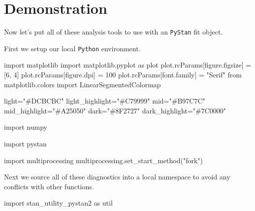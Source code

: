 \documentclass[
  letterpaper,
  DIV=11,
  numbers=noendperiod]{scrartcl}
\newenvironment{Shaded}{\begin{snugshade}}{\end{snugshade}}
\newcommand{\DecValTok}[1]{\textcolor[rgb]{0.68,0.00,0.00}{#1}}
\newcommand{\ImportTok}[1]{\textcolor[rgb]{0.00,0.46,0.62}{#1}}
\newcommand{\NormalTok}[1]{\textcolor[rgb]{0.00,0.23,0.31}{#1}}
\newcommand{\OperatorTok}[1]{\textcolor[rgb]{0.37,0.37,0.37}{#1}}
\newcommand{\StringTok}[1]{\textcolor[rgb]{0.13,0.47,0.30}{#1}}
\begin{document}
\hypertarget{demonstration}{%
\section{Demonstration}\label{demonstration}}

Now let's put all of these analysis tools to use with an \texttt{PyStan}
fit object.

First we setup our local \texttt{Python} environment.

\begin{Shaded}
\begin{Highlighting}[]
\ImportTok{import}\NormalTok{ matplotlib}
\ImportTok{import}\NormalTok{ matplotlib.pyplot }\ImportTok{as}\NormalTok{ plot}
\NormalTok{plot.rcParams[}\StringTok{\textquotesingle{}figure.figsize\textquotesingle{}}\NormalTok{] }\OperatorTok{=}\NormalTok{ [}\DecValTok{6}\NormalTok{, }\DecValTok{4}\NormalTok{]}
\NormalTok{plot.rcParams[}\StringTok{\textquotesingle{}figure.dpi\textquotesingle{}}\NormalTok{] }\OperatorTok{=} \DecValTok{100}
\NormalTok{plot.rcParams[}\StringTok{\textquotesingle{}font.family\textquotesingle{}}\NormalTok{] }\OperatorTok{=} \StringTok{"Serif"}
\ImportTok{from}\NormalTok{ matplotlib.colors }\ImportTok{import}\NormalTok{ LinearSegmentedColormap}

\NormalTok{light}\OperatorTok{=}\StringTok{"\#DCBCBC"}
\NormalTok{light\_highlight}\OperatorTok{=}\StringTok{"\#C79999"}
\NormalTok{mid}\OperatorTok{=}\StringTok{"\#B97C7C"}
\NormalTok{mid\_highlight}\OperatorTok{=}\StringTok{"\#A25050"}
\NormalTok{dark}\OperatorTok{=}\StringTok{"\#8F2727"}
\NormalTok{dark\_highlight}\OperatorTok{=}\StringTok{"\#7C0000"}

\ImportTok{import}\NormalTok{ numpy}

\ImportTok{import}\NormalTok{ pystan}

\ImportTok{import}\NormalTok{ multiprocessing}
\NormalTok{multiprocessing.set\_start\_method(}\StringTok{"fork"}\NormalTok{)}
\end{Highlighting}
\end{Shaded}

Next we source all of these diagnostics into a local namespace to avoid
any conflicts with other functions.

\begin{Shaded}
\begin{Highlighting}[]
\ImportTok{import}\NormalTok{ stan\_utility\_pystan2 }\ImportTok{as}\NormalTok{ util}
\end{Highlighting}
\end{Shaded}
\end{document}
